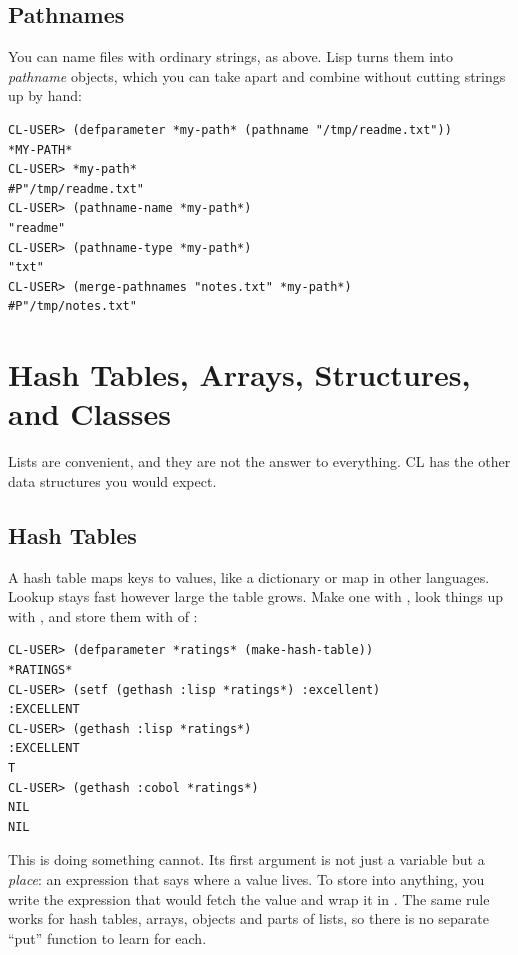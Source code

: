 \subsection{Pathnames}

You can name files with ordinary strings, as above. Lisp turns them
into \emph{pathname} objects, which you can take apart and combine
without cutting strings up by hand:

\begin{verbatim}
CL-USER> (defparameter *my-path* (pathname "/tmp/readme.txt"))
*MY-PATH*
CL-USER> *my-path*
#P"/tmp/readme.txt"
CL-USER> (pathname-name *my-path*)
"readme"
CL-USER> (pathname-type *my-path*)
"txt"
CL-USER> (merge-pathnames "notes.txt" *my-path*)
#P"/tmp/notes.txt"
\end{verbatim}

\section{Hash Tables, Arrays, Structures, and Classes}

Lists are convenient, and they are not the answer to everything. CL
has the other data structures you would expect.

\subsection{Hash Tables}
\label{sec:hash-tables}

A hash table maps keys to values, like a dictionary or map in other
languages. Lookup stays fast however large the table grows. Make one
with , look things up with , and
store them with  of :

\begin{verbatim}
CL-USER> (defparameter *ratings* (make-hash-table))
*RATINGS*
CL-USER> (setf (gethash :lisp *ratings*) :excellent)
:EXCELLENT
CL-USER> (gethash :lisp *ratings*)
:EXCELLENT
T
CL-USER> (gethash :cobol *ratings*)
NIL
NIL
\end{verbatim}

This is  doing something  cannot. Its first
argument is not just a variable but a \emph{place}: an expression
that says where a value lives. To store into anything, you write the
expression that would fetch the value and wrap it in . The
same rule works for hash tables, arrays, objects and parts of lists,
so there is no separate ``put'' function to learn for each.

